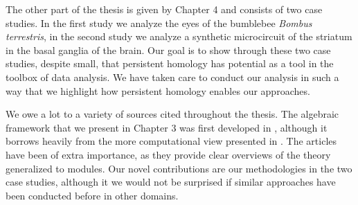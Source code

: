 The other part of the thesis is given by Chapter 4 and consists of two case studies. In the first study we analyze the eyes of the bumblebee \textit{Bombus terrestris}, in the second study we analyze a synthetic microcircuit of the striatum in the basal ganglia of the brain. Our goal is to show through these two case studies, despite small, that persistent homology has potential as a tool in the toolbox of data analysis. We have taken care to conduct our analysis in such a way that we highlight how persistent homology enables our approaches.

We owe a lot to a variety of sources cited throughout the thesis. The algebraic framework that we present in Chapter 3 was first developed in \cite{Zomorodian2005}, although it borrows heavily from the more computational view presented in \cite{edelszom}. The articles \cite{vejdemo,skraba} have been of extra importance, as they provide clear overviews of the theory generalized to modules. Our novel contributions are our methodologies in the two case studies, although it we would not be surprised if similar approaches have been conducted before in other domains.


